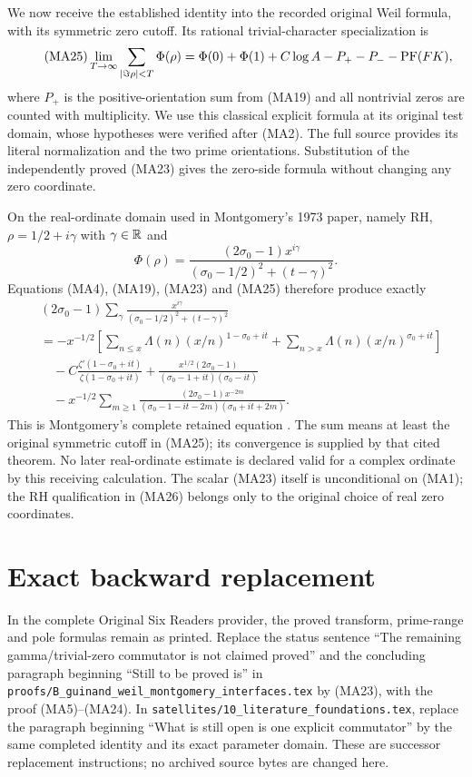 \documentclass[11pt,a4paper]{article}
\begin{document}
We now receive the established identity into the recorded original Weil
formula, with its symmetric zero cutoff. Its rational trivial-character
specialization is \cite[formula (11)]{a03ma:Weil}
\begin{equation}\tag{MA25}
 \lim_{T\to\infty}\sum_{|\Im\rho|<T}\Phi(\rho)
 =\Phi(0)+\Phi(1)+C\log A-P_+-P_--\operatorname{PF}(FK),
\end{equation}
where $P_+$ is the positive-orientation sum from (MA19) and all nontrivial
zeros are counted with multiplicity. We use this classical explicit formula
at its original test domain, whose hypotheses were verified after (MA2).
The full source provides its literal normalization and the two prime orientations.
Substitution of the independently proved (MA23) gives the zero-side formula
without changing any zero coordinate.

On the real-ordinate domain used in Montgomery's 1973 paper, namely RH,
$\rho=1/2+i\gamma$ with $\gamma\in\mathbb R$ and
\[
 \Phi(\rho)=\frac{(2\sigma_0-1)x^{i\gamma}}
 { (\sigma_0-1/2)^2+(t-\gamma)^2}.
\]
Equations (MA4), (MA19), (MA23) and (MA25) therefore produce exactly
\begin{equation}\tag{MA26}\begin{aligned}
 &(2\sigma_0-1)\sum_\gamma
 \frac{x^{i\gamma}}{(\sigma_0-1/2)^2+(t-\gamma)^2}\\
 &=-x^{-1/2}\left[
 \sum_{n\le x}\Lambda(n)(x/n)^{1-\sigma_0+it}
 +\sum_{n>x}\Lambda(n)(x/n)^{\sigma_0+it}\right]\\
 &\quad-C\frac{\zeta'(1-\sigma_0+it)}{\zeta(1-\sigma_0+it)}
 +\frac{x^{1/2}(2\sigma_0-1)}{(\sigma_0-1+it)(\sigma_0-it)}\\
 &\quad-x^{-1/2}\sum_{m\ge1}
 \frac{(2\sigma_0-1)x^{-2m}}
 {(\sigma_0-1-it-2m)(\sigma_0+it+2m)}.
\end{aligned}\end{equation}
This is Montgomery's complete retained equation \cite[pp.~185--187]{a03ma:Montgomery}.
The sum means at least the original symmetric cutoff in (MA25); its
convergence is supplied by that cited theorem. No later real-ordinate estimate
is declared valid for a complex ordinate by this receiving calculation.
The scalar (MA23) itself is unconditional on (MA1); the RH qualification in
(MA26) belongs only to the original choice of real zero coordinates.

\section{Exact backward replacement}
In the complete Original Six Readers provider, the proved transform,
prime-range and pole formulas remain as printed. Replace the status sentence
``The remaining gamma/trivial-zero commutator is not claimed proved'' and
the concluding paragraph beginning ``Still to be proved is'' in
\nolinkurl{proofs/B_guinand_weil_montgomery_interfaces.tex} by (MA23),
with the proof (MA5)--(MA24). In
\texttt{satellites/10\_literature\_foundations.tex}, replace the paragraph
beginning ``What is still open is one explicit commutator'' by the same
completed identity and its exact parameter domain. These are successor
replacement instructions; no archived source bytes are changed here.
\end{document}
